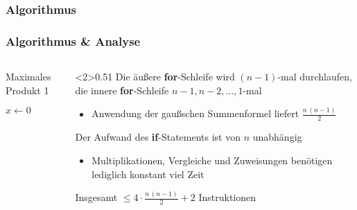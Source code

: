\begin{frame}
\frametitle<1>{Algorithmus}
\frametitle<2>{Algorithmus \& Analyse}
\begin{columns}[T,onlytextwidth]
    \begin{column}{0.43\textwidth}
        \vspace{-5pt}
        \begin{algorithm}[H]
        	\caption{Maximales Produkt 1}
        	\label{alg:max_prod}
        	\DontPrintSemicolon
        	$x \gets 0$\;
        \end{algorithm}
    \end{column}
    \begin{column}<2>{0.51\textwidth}
        Die \"au{\ss}ere \textbf{for}-Schleife wird $(n-1)$-mal durchlaufen, die innere \textbf{for}-Schleife $n-1, n-2, \dots, 1$-mal
        \begin{itemize}
            \item Anwendung der \alert{gaußschen Summenformel} liefert $\frac{n \, (n-1)}{2}$
        \end{itemize}
        
        Der Aufwand des \textbf{if}-Statements ist von $n$ \alert{unabh\"angig}
        \begin{itemize}
            \item Multiplikationen, Vergleiche und Zuweisungen ben\"otigen lediglich \alert{konstant} viel Zeit
        \end{itemize}
        
        Insgesamt $\leq 4 \cdot \frac{n \, (n-1)}{2} + 2$ Instruktionen
    \end{column}
\end{columns}
\end{frame}



